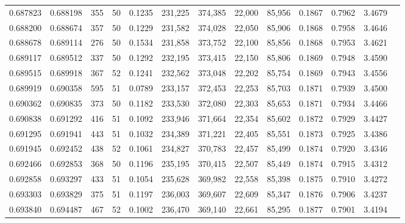 \begin{tabular}{rrrrrrrrrrrrr}
0.687823 & 0.688198 &   355 &  50 &                                     0.1235 & 231,225 & 374,385 &  22,000 &  85,956 & 0.1867 & 0.7962 & 3.4679 \\
0.688200 & 0.688674 &   357 &  50 &                                     0.1229 & 231,582 & 374,028 &  22,050 &  85,906 & 0.1868 & 0.7958 & 3.4646 \\
0.688678 & 0.689114 &   276 &  50 &                                     0.1534 & 231,858 & 373,752 &  22,100 &  85,856 & 0.1868 & 0.7953 & 3.4621 \\
0.689117 & 0.689512 &   337 &  50 &                                     0.1292 & 232,195 & 373,415 &  22,150 &  85,806 & 0.1869 & 0.7948 & 3.4590 \\
0.689515 & 0.689918 &   367 &  52 &                                     0.1241 & 232,562 & 373,048 &  22,202 &  85,754 & 0.1869 & 0.7943 & 3.4556 \\
0.689919 & 0.690358 &   595 &  51 &                                     0.0789 & 233,157 & 372,453 &  22,253 &  85,703 & 0.1871 & 0.7939 & 3.4500 \\
0.690362 & 0.690835 &   373 &  50 &                                     0.1182 & 233,530 & 372,080 &  22,303 &  85,653 & 0.1871 & 0.7934 & 3.4466 \\
0.690838 & 0.691292 &   416 &  51 &                                     0.1092 & 233,946 & 371,664 &  22,354 &  85,602 & 0.1872 & 0.7929 & 3.4427 \\
0.691295 & 0.691941 &   443 &  51 &                                     0.1032 & 234,389 & 371,221 &  22,405 &  85,551 & 0.1873 & 0.7925 & 3.4386 \\
0.691945 & 0.692452 &   438 &  52 &                                     0.1061 & 234,827 & 370,783 &  22,457 &  85,499 & 0.1874 & 0.7920 & 3.4346 \\
0.692466 & 0.692853 &   368 &  50 &                                     0.1196 & 235,195 & 370,415 &  22,507 &  85,449 & 0.1874 & 0.7915 & 3.4312 \\
0.692858 & 0.693297 &   433 &  51 &                                     0.1054 & 235,628 & 369,982 &  22,558 &  85,398 & 0.1875 & 0.7910 & 3.4272 \\
0.693303 & 0.693829 &   375 &  51 &                                     0.1197 & 236,003 & 369,607 &  22,609 &  85,347 & 0.1876 & 0.7906 & 3.4237 \\
0.693840 & 0.694487 &   467 &  52 &                                     0.1002 & 236,470 & 369,140 &  22,661 &  85,295 & 0.1877 & 0.7901 & 3.4194 \\

\end{tabular}
